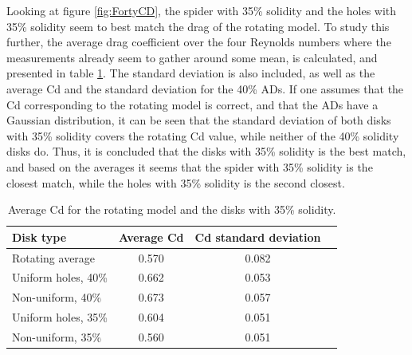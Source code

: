 

Looking at figure \ref{fig:FortyCD}, the \gls{spider} with 35\% solidity and the \gls{holes} with 35\% solidity seem to best match the drag of the rotating model. To study this further, the average drag coefficient over the four Reynolds numbers where the measurements already seem to gather around some mean, is calculated, and presented in table \ref{tab:AvgCD}. The standard deviation is also included, as well as the average Cd and the standard deviation for the 40\% \gls{AD}s. If one assumes that the Cd corresponding to the rotating model is correct, and that the \gls{AD}s have a Gaussian distribution, it can be seen that the standard deviation of both disks with 35\% solidity covers the rotating Cd value, while neither of the 40\% solidity disks do. Thus, it is concluded that the disks with 35\% solidity is the best match, and based on the averages it seems that the \gls{spider} with 35\% solidity is the closest match, while the \gls{holes} with 35\% solidity is the second closest.


\begin{table}
    \centering
    \begin{tabular}{l c c r}
         Disk type & Average Cd & Cd standard deviation \\
         \hline
         Rotating average & 0.570 & 0.082 \\
         Uniform holes, 40\% & 0.662 & 0.053 \\
         Non-uniform, 40\% & 0.673 & 0.057 \\
         Uniform holes, 35\% & 0.604 & 0.051 \\
         Non-uniform, 35\% & 0.560 & 0.051 \\
    \end{tabular}
    \caption{Average Cd for the rotating model and the disks with 35\% solidity.}
    \label{tab:AvgCD}
\end{table}








